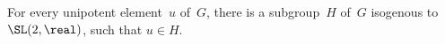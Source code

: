 

\begin{thm}
\label{JacobsonMorosov}
 For every unipotent element~$u$ of~$G$, there is a
subgroup~$H$ of~$G$ isogenous to $\SL(2,\real)$, such that
$u \in H$.
\end{thm}


